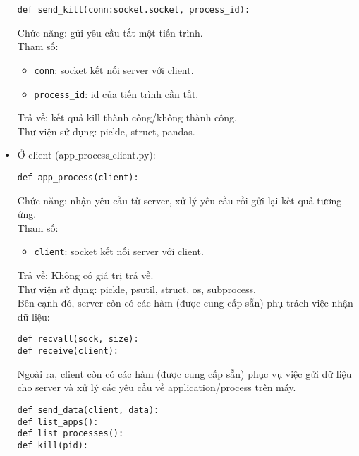 \begin{itemize}
\begin{lstlisting}
def send_kill(conn:socket.socket, process_id): 
\end{lstlisting}
Chức năng: gửi yêu cầu tắt một tiến trình.\\
Tham số: 
\begin{itemize}
\item \lstinline{conn}: socket kết nối server với client.
\item \lstinline{process_id}: id của tiến trình cần tắt.
\end{itemize}
Trả về: kết quả kill thành công/không thành công.\\
Thư viện sử dụng: pickle, struct, pandas.
\item Ở client (app$\_$process$\_$client.py):
\begin{lstlisting}
def app_process(client):
\end{lstlisting}
Chức năng: nhận yêu cầu từ server, xử lý yêu cầu rồi gửi lại kết quả tương ứng. \\
Tham số: 
\begin{itemize}
\item \lstinline{client}: socket kết nối server với client.
\end{itemize}
Trả về: Không có giá trị trả về.\\
Thư viện sử dụng: pickle, psutil, struct, os, subprocess.\\
Bên cạnh đó, server còn có các hàm (được cung cấp sẵn) phụ trách việc nhận dữ liệu:
\begin{lstlisting}
def recvall(sock, size):
def receive(client):
\end{lstlisting}
Ngoài ra, client còn có các hàm (được cung cấp sẵn) phục vụ việc gửi dữ liệu cho server và xử lý các yêu cầu về application/process trên máy.
\begin{lstlisting}
def send_data(client, data):
def list_apps():
def list_processes():
def kill(pid):
\end{lstlisting}
\end{itemize}





